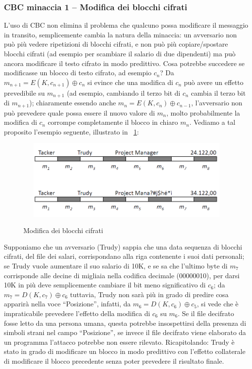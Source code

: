 \subsubsection{CBC minaccia 1 – Modifica dei blocchi cifrati}
L’uso di CBC non elimina il problema che qualcuno possa modificare il messaggio in transito, semplicemente cambia la natura della minaccia: un avversario non può più vedere ripetizioni di blocchi cifrati, e non può più copiare/spostare blocchi cifrati (ad esempio per scambiare il salario di due dipendenti) ma può ancora modificare il testo cifrato in modo predittivo. \newline
Cosa potrebbe succedere se modificasse un blocco di testo cifrato, ad esempio $c_{n}$?\newline
Da $m_{n+1} = E(K,c_{n+1})\oplus c_{n}$ si evince che una modifica di $c_{n}$ può avere un effetto prevedibile su $m_{n+1}$ (ad esempio, cambiando il terzo bit di $c_{n}$ cambia il terzo bit di $m_{n+1}$);
chiaramente essendo anche $m_{n} = E(K,c_{n})\oplus c_{n-1}$,  l'avversario non può prevedere quale possa essere il nuovo valore di $m_{n}$, molto probabilmente la modifica di $c_{n}$ corrompe completamente il blocco in chiaro $m_{n}$.\newline
Vediamo a tal proposito l'esempio seguente, illustrato in \figurename ~\ref{fig:modifica_blk_cifrati}:
\begin{figure}[htbp]
	\centering%
	\subfigure%
	{\includegraphics[height=4cm, width=12cm, keepaspectratio]{Immagini/Capitolo3/modifica_blk_cifrati.png}}
	\caption{Modifica dei blocchi cifrati \label{fig:modifica_blk_cifrati}}	
\end{figure}
\newline Supponiamo che un avversario (Trudy) sappia che una data sequenza di blocchi cifrati, del file
dei salari, corrispondano alla riga contenente i suoi dati personali; se Trudy vuole aumentare il suo salario di 10K, e se sa che l'ultimo byte di $m_{7}$ corrisponde alle decine di migliaia nella codifica decimale (00000010), per darsi 10K in più deve semplicemente cambiare il bit meno significativo di $c_{6}$; da $m_{7} = D(K, c_{7}) \oplus c_{6}$ tuttavia, Trudy non sarà più in grado di predire cosa apparirà nella voce “Posizione”, infatti, da $m_{6} = D(K, c_{6}) \oplus c_{5}$, si vede che è impraticabile
prevedere l'effetto della modifica di $c_{6}$ su $m_{6}$. Se il file decifrato fosse letto da una persona umana, questa potrebbe insospettirsi della presenza di simboli strani nel campo “Posizione”, se invece il file decifrato viene elaborato da un programma l'attacco potrebbe non essere rilevato.\newline \newline
Ricapitolando: Trudy è stato in grado di modificare un blocco in modo predittivo con l'effetto collaterale di modificare il blocco precedente senza poter prevedere il risultato finale.
